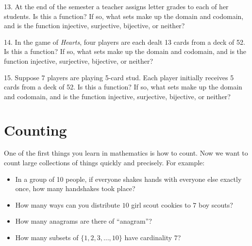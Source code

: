 \documentclass[10pt,]{book}
\theoremstyle{plain}
\theoremstyle{definition}
\theoremstyle{definition}
\theoremstyle{definition}
\numberwithin{equation}{chapter}
\begin{document}
\begin{exerciselist}
\par\smallskip
\item[13.]\hypertarget{exercise-39}{}
            At the end of the semester a teacher assigns letter grades to each of her students. Is this a function? If so, what sets make up the domain and codomain, and is the function injective, surjective, bijective, or neither?
\par\smallskip
\item[14.]\hypertarget{exercise-40}{}
            In the game of \emph{Hearts}, four players are each dealt 13 cards from a deck of 52. Is this a function? If so, what sets make up the domain and codomain, and is the function injective, surjective, bijective, or neither?
\par\smallskip
\item[15.]\hypertarget{exercise-41}{}
            Suppose 7 players are playing 5-card stud. Each player initially receives 5 cards from a deck of 52. Is this a function? If so, what sets make up the domain and codomain, and is the function injective, surjective, bijective, or neither?
\par\smallskip
\end{exerciselist}
\typeout{************************************************}
\typeout{************************************************}
\chapter[Counting]{Counting}\label{ch_counting}
\typeout{************************************************}
\typeout{************************************************}

One of the first things you learn in mathematics is how to count. Now we want to count large collections of things quickly and precisely. For example:
%
\leavevmode%
\begin{itemize}[label=\textbullet]
\item{}
In a group of 10 people, if everyone shakes hands with everyone else exactly once, how many handshakes took place?
%
\item{}
How many ways can you distribute \(10\) girl scout cookies to \(7\) boy scouts?
%
\item{}
How many anagrams are there of ``anagram''?
%
\item{}
How many subsets of \(\{1,2,3,\ldots, 10\}\) have cardinality \(7\)?
%
\end{itemize}
\par
\end{document}
